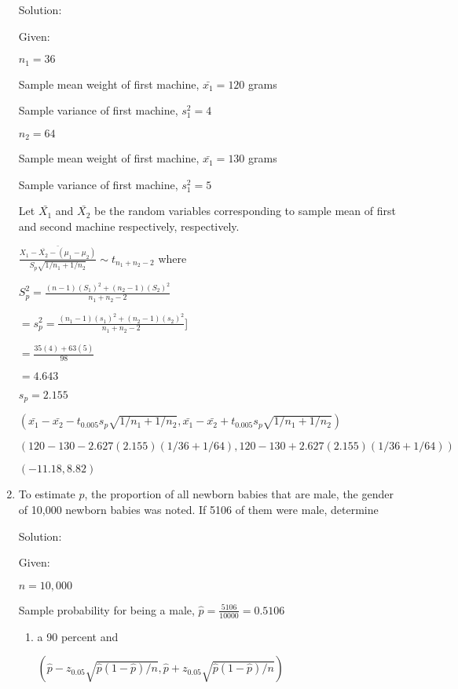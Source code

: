 \documentclass{article}
\begin{document}
\begin{enumerate}
    Solution:

    Given:

    $n_1=36$

    Sample mean weight of first machine, $\bar{x_1} = 120$ grams
    
    Sample variance of first machine, $s_1^2 = 4$

    $n_2=64$

    Sample mean weight of first machine, $\bar{x_1} = 130$ grams
    
    Sample variance of first machine, $s_1^2 = 5$
    
    Let $\bar{X_1}$ and $\bar{X_2}$ be the random variables corresponding to sample mean of first and second machine respectively, respectively.

    $\displaystyle \frac{\bar{X_1 - \bar{X_2} - \left(\mu_1 - \mu_2\right)}}{S_p\sqrt{1/n_1 + 1/n_2}} \sim t_{n_1+n_2-2}$ where

    $\displaystyle S_p^2 = \frac{(n-1)(S_1)^2+(n_2-1)(S_2)^2}{n_1+n_2-2}$

    $= \displaystyle s_p^2=\frac{(n_1-1)(s_1)^2+(n_2-1)(s_2)^2}{n_1+n_2-2}$]
    
    $= \displaystyle \frac{35(4)+ 63(5)}{98}$

    $= 4.643$

    $s_p = 2.155$

    $\left(\bar{x_1} - \bar{x_2} - t_{0.005}s_p{\sqrt{1/n_1+1/n_2}}, \bar{x_1} - \bar{x_2} + t_{0.005}s_p{\sqrt{1/n_1+1/n_2}}\right)$

    $\left(120 - 130 - 2.627(2.155){(1/36+1/64)}, 120 - 130 + 2.627(2.155){(1/36+1/64)}\right)$

    $\left(-11.18, 8.82\right)$

    \item  To estimate $p$, the proportion of all newborn babies that are male, the gender of 10,000 newborn babies was noted. If 5106 of them were male, determine
   
    Solution:

    Given:

    $n=10,000$

    Sample probability for being a male, $\displaystyle \hat{p}=\frac{5106}{10000} = 0.5106$
    \begin{enumerate}
        \item a 90 percent and
        
        $(\hat{p} - z_{0.05}\sqrt{\hat{p}(1-\hat{p})/n}, \hat{p} + z_{0.05}\sqrt{\hat{p}(1-\hat{p})/n})$\


\end{enumerate}
\end{enumerate}
\end{document}
